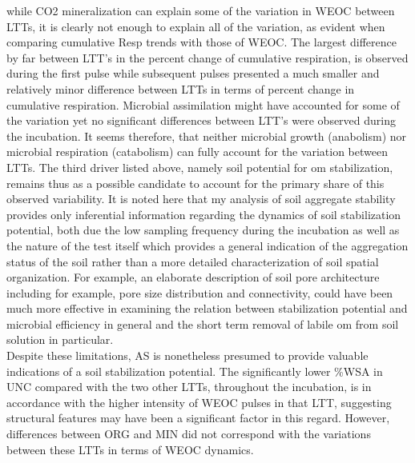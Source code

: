 \documentclass[12pt]{report}
\begin{document}
		
		while  CO2 mineralization can explain some of the variation in WEOC between LTTs, it is clearly not enough to explain all of the variation, as evident when comparing cumulative Resp trends with those of WEOC. The largest difference by far between LTT's in the percent change of cumulative respiration, is observed during the first pulse while subsequent pulses presented a much smaller and relatively minor difference between LTTs in terms of percent change in cumulative respiration.
		Microbial assimilation might have accounted for some of the variation yet no significant differences between LTT's were observed during the incubation.
		It seems therefore, that neither microbial growth (anabolism) nor microbial respiration (catabolism) can fully account for the variation between LTTs. The third driver listed above, namely soil potential for \gls{om} stabilization, remains thus as a possible candidate to account for the primary share of this observed variability. It is noted here that my analysis of soil aggregate stability provides only inferential information regarding the dynamics of soil stabilization potential, both due the low sampling frequency during the incubation as well as the nature of the test itself which provides a general indication of the aggregation status of the soil rather than a more detailed characterization of soil spatial organization. For example, an elaborate description of soil pore architecture including for example, pore size distribution and connectivity, could have been much more effective in examining the relation between stabilization potential and microbial efficiency in general and the short term removal of labile \gls{om} from soil solution in particular. \\
		Despite these limitations, AS is nonetheless presumed to provide valuable indications of a soil stabilization potential. The significantly lower \%WSA in UNC compared with the two other LTTs, throughout the incubation, is in accordance with the higher intensity of WEOC pulses in that LTT, suggesting structural features may have been a significant factor in this regard. However, differences between ORG and MIN did not correspond with the variations between these LTTs in terms of WEOC dynamics.  \\
		
\end{document}
